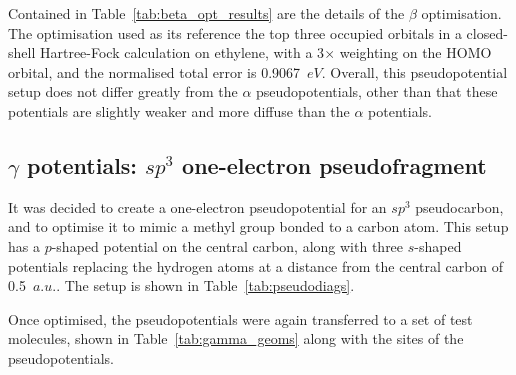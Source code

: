 \documentclass[aip,reprint,nofootinbib]{revtex4-1}
\begin{document}
Contained in Table~\ref{tab:beta_opt_results} are the details of the $\beta$ optimisation. The optimisation used as its reference the top three occupied orbitals in a closed-shell Hartree-Fock calculation on ethylene, with a 3$\times$ weighting on the HOMO orbital, and the normalised total error is 0.9067~$eV$. Overall, this pseudopotential setup does not differ greatly from the $\alpha$ pseudopotentials, other than that these potentials are slightly weaker and more diffuse than the $\alpha$ potentials. 

\subsection{$\gamma$ potentials: $sp^{3}$ one-electron pseudofragment}

It was decided to create a one-electron pseudopotential for an $sp^3$ pseudocarbon, and to  optimise it to mimic a methyl group bonded to a carbon atom. This setup has a $p$-shaped potential on the central carbon, along with three $s$-shaped potentials replacing the hydrogen atoms at a distance from the central carbon of 0.5~$a.u.$. The setup is shown in Table~\ref{tab:pseudodiags}.

Once optimised, the pseudopotentials were again transferred to a set of test molecules, shown in Table~\ref{tab:gamma_geoms} along with the sites of the pseudopotentials.
\end{document}
